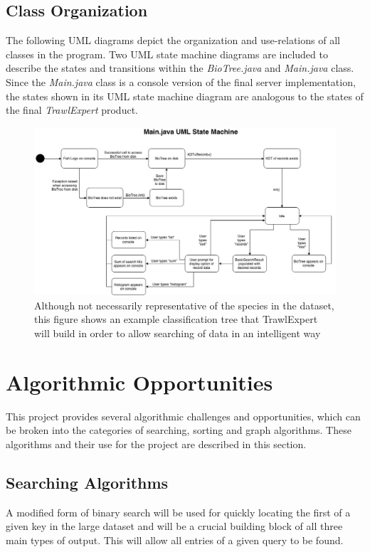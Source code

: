 \documentclass{article}
\begin{document}
\subsection{Class Organization}
The following UML diagrams depict the organization and use-relations of all classes in the program. Two UML state machine diagrams are included to describe the states and transitions within the \textit{BioTree.java} and \textit{Main.java} class. Since the \textit{Main.java} class is a console version of the final server implementation, the states shown in its UML state machine diagram are analogous to the states of the final \textit{TrawlExpert} product.

\begin{figure}[h]
\includegraphics[width=16cm]{MainDotJava.jpg}

\caption{Although not necessarily representative of the species in the dataset, this figure shows an example classification tree that TrawlExpert will build in order to allow searching of data in an intelligent way}
\label{fig:Tree}
\end{figure}



\section{Algorithmic Opportunities}
This project provides several algorithmic challenges and opportunities, which can be broken into the categories of searching, sorting and graph algorithms. These algorithms and their use for the project are described in this section.

\subsection{Searching Algorithms}
A modified form of binary search will be used for quickly locating the first of a given key in the large dataset and will be a crucial building block of all three main types of output. This will allow all entries of a given query to be found.
\end{document}

